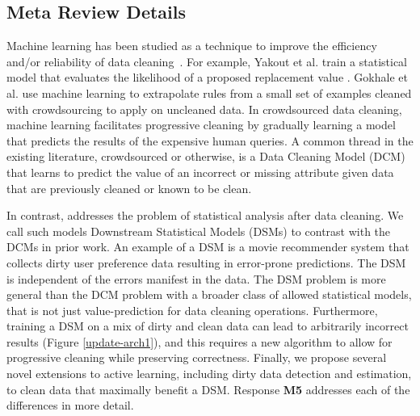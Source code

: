 \subsection*{Meta Review Details} 
Machine learning has been studied as a technique to improve the efficiency and/or reliability of data cleaning~\cite{yakout2013don,gokhale2014corleone}.
For example, Yakout et al. train a statistical model that evaluates the likelihood of a proposed replacement value \cite{yakout2013don}.
Gokhale et al. \cite{gokhale2014corleone} use machine learning to extrapolate rules from a small set of examples cleaned with crowdsourcing to apply on uncleaned data.
In crowdsourced data cleaning, machine learning facilitates progressive cleaning by gradually learning a model that predicts the results of the expensive human queries.
A common thread in the existing literature, crowdsourced or otherwise, is a Data Cleaning Model (DCM) that learns to predict the value of an incorrect or missing attribute given data that are previously cleaned or known to be clean.

In contrast, \sys addresses the problem of statistical analysis after data cleaning.
We call such models Downstream Statistical Models (DSMs) to contrast with the DCMs in prior work.
An example of a DSM is a movie recommender system that collects dirty user preference data resulting in error-prone predictions.
The DSM is independent of the errors manifest in the data.
The DSM problem is more general than the DCM problem with a broader class of allowed statistical models, that is not just value-prediction for data cleaning operations.
Furthermore, training a DSM on a mix of dirty and clean data can lead to arbitrarily incorrect results (Figure \ref{update-arch1}), and this requires a new algorithm to allow for progressive cleaning while preserving correctness.
Finally, we propose several novel extensions to active learning, including dirty data detection and estimation, to clean data that maximally benefit a DSM.
Response \textbf{M5} addresses each of the differences in more detail.


\vspace{0.5em}

